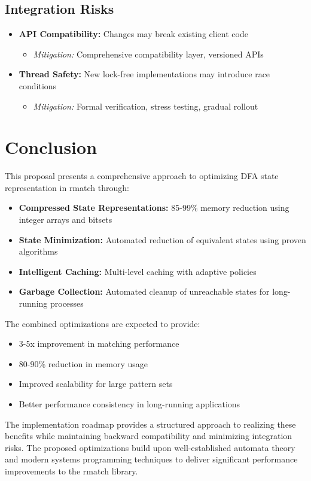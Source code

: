 \documentclass[11pt,a4paper]{article}
\begin{document}
\subsection{Integration Risks}

\begin{itemize}
    \item \textbf{API Compatibility:} Changes may break existing client code
    \begin{itemize}
        \item \textit{Mitigation:} Comprehensive compatibility layer, versioned APIs
    \end{itemize}
    
    \item \textbf{Thread Safety:} New lock-free implementations may introduce race conditions
    \begin{itemize}
        \item \textit{Mitigation:} Formal verification, stress testing, gradual rollout
    \end{itemize}
\end{itemize}

\section{Conclusion}

This proposal presents a comprehensive approach to optimizing DFA state representation in rmatch through:

\begin{itemize}
    \item \textbf{Compressed State Representations:} 85-99\% memory reduction using integer arrays and bitsets
    \item \textbf{State Minimization:} Automated reduction of equivalent states using proven algorithms
    \item \textbf{Intelligent Caching:} Multi-level caching with adaptive policies
    \item \textbf{Garbage Collection:} Automated cleanup of unreachable states for long-running processes
\end{itemize}

The combined optimizations are expected to provide:
\begin{itemize}
    \item 3-5x improvement in matching performance
    \item 80-90\% reduction in memory usage
    \item Improved scalability for large pattern sets
    \item Better performance consistency in long-running applications
\end{itemize}

The implementation roadmap provides a structured approach to realizing these benefits while maintaining backward compatibility and minimizing integration risks. The proposed optimizations build upon well-established automata theory and modern systems programming techniques to deliver significant performance improvements to the rmatch library.



\end{document}
